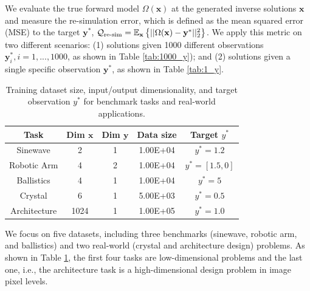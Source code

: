 \documentclass[letterpaper]{article} %
\begin{document}
\vspace{0.2cm}
 We evaluate the true forward model $\Omega(\mathbf{x})$ at the generated inverse solutions $\mathbf{x}$ and measure the re-simulation error, which is defined as the mean squared error (MSE) to the target $\mathbf{y}^*$, $\mathcal{Q}_{\textup{re-sim}} = \mathbb{E}_{\mathbf{x}}\left\{ ||\Omega(\mathbf{x}) - \mathbf{y}^*||_2^2 \right\}$.
We apply this metric on two different scenarios: (1) solutions given 1000 different observations $\mathbf{y}_i^*, i=1,...,1000$, as shown in Table \ref{tab:1000_y}); and (2) solutions given a single specific observation $\mathbf{y}^*$, as shown in Table \ref{tab:1_y}.
\begin{table}[h!]
\vspace{-0.2cm}
\footnotesize
\centering
\caption{Training dataset size, input/output dimensionality, and target observation $y^*$ for benchmark tasks and real-world applications.} 
\vspace{-0.2cm}
\label{tab:dataset}
\begin{tabular}{@{}ccccc@{}}
\toprule
Task        & Dim $\mathbf{x}$ & Dim $\mathbf{y}$ & Data size & Target  $y^*$ \\ \midrule
Sinewave        & 2     & 1         & 1.00E+04  & $y^*=1.2$     \\
Robotic Arm & 4     & 2         & 1.00E+04 & $y^*=[1.5,0]$     \\
Ballistics  & 4     & 1          & 1.00E+04 & $y^*=5$     \\
Crystal     & 6     & 1          & 5.00E+03  & $y^*=0.5$    \\ 
Architecture     & 1024     & 1          & 1.00E+05  & $y^*=1.0$    \\ 
\bottomrule
\end{tabular}
\end{table}

\vspace{0.2cm}
 We focus on five datasets, including three benchmarks (sinewave, robotic arm, and ballistics) and two real-world (crystal and architecture design) problems. As shown in Table \ref{tab:dataset}, the first four tasks are low-dimensional problems and the last one, i.e., the architecture task is a high-dimensional design problem in image pixel levels. 
\end{document}
